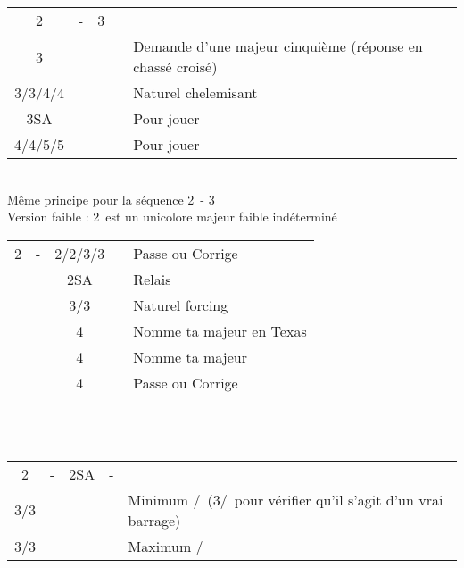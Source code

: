 \documentclass[a4paper, oneside, 11pt]{report}
\begin{document}
	\begin{tabular}{cccc|l}
	2\trefle & - & 3\trefle &&\\
	3\carreau &&&& Demande d'une majeur cinquième (réponse en chassé croisé)\\
	3\coeur/3\pique/4\trefle/4\carreau &&&& Naturel chelemisant\\
	3SA &&&& Pour jouer\\
	4\coeur/4\pique/5\trefle/5\carreau &&&& Pour jouer\\	
	\end{tabular}\\
	Même principe pour la séquence 2\trefle\ - 3\carreau\\

	Version faible : 2\carreau\ est un unicolore majeur faible indéterminé\\

	\begin{tabular}{cccc|l}
	2\carreau & - & 2\coeur/2\pique/3\coeur/3\pique && Passe ou Corrige\\
	&& 2SA && Relais\\
	&& 3\trefle/3\carreau && Naturel forcing\\
	&& 4\trefle && Nomme ta majeur en Texas\\
	&& 4\carreau && Nomme ta majeur\\
	&& 4\coeur && Passe ou Corrige\\
	\end{tabular}\\\\

	\begin{tabular}{cccc|l}
	2\carreau & - & 2SA & - &\\
	3\trefle/3\carreau &&&& Minimum \coeur/\pique\ (3\carreau/\coeur\ pour vérifier qu'il s'agit d'un vrai barrage)\\
	3\coeur/3\pique &&&& Maximum \pique/\coeur\\
	\end{tabular}\\\\
\end{document}
